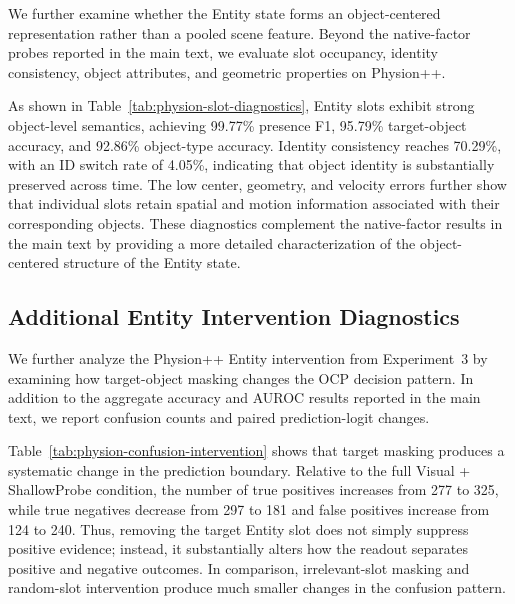 \documentclass{article}
\begin{document}
We further examine whether the Entity state forms an object-centered representation rather than a pooled scene feature. Beyond the native-factor probes reported in the main text, we evaluate slot occupancy, identity consistency, object attributes, and geometric properties on Physion++.



As shown in Table~\ref{tab:physion-slot-diagnostics}, Entity slots exhibit strong object-level semantics, achieving 99.77\% presence F1, 95.79\% target-object accuracy, and 92.86\% object-type accuracy. Identity consistency reaches 70.29\%, with an ID switch rate of 4.05\%, indicating that object identity is substantially preserved across time. The low center, geometry, and velocity errors further show that individual slots retain spatial and motion information associated with their corresponding objects. These diagnostics complement the native-factor results in the main text by providing a more detailed characterization of the object-centered structure of the Entity state.

\subsection{Additional Entity Intervention Diagnostics}
\label{app:entity-intervention-diagnostics}

We further analyze the Physion++ Entity intervention from Experiment~3 by examining how target-object masking changes the OCP decision pattern. In addition to the aggregate accuracy and AUROC results reported in the main text, we report confusion counts and paired prediction-logit changes.



Table~\ref{tab:physion-confusion-intervention} shows that target masking produces a systematic change in the prediction boundary. Relative to the full Visual + ShallowProbe condition, the number of true positives increases from 277 to 325, while true negatives decrease from 297 to 181 and false positives increase from 124 to 240. Thus, removing the target Entity slot does not simply suppress positive evidence; instead, it substantially alters how the readout separates positive and negative outcomes. In comparison, irrelevant-slot masking and random-slot intervention produce much smaller changes in the confusion pattern.


\end{document}
